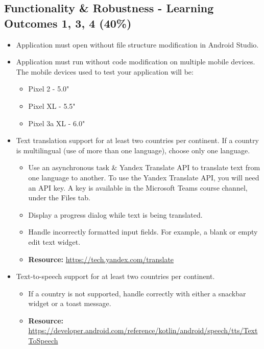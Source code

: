 \documentclass{article}
\begin{document}
\subsection*{Functionality \& Robustness - Learning Outcomes 1, 3, 4 (40\%)}
\begin{itemize}
	\item Application must open without file structure modification in Android Studio.
	\item Application must run without code modification on multiple mobile devices. The mobile devices used to test your application will be:
	      \begin{itemize}
	      	\item Pixel 2 - 5.0"
	      	\item Pixel XL - 5.5"
	      	\item Pixel 3a XL - 6.0"
	      \end{itemize}
	\item Text translation support for at least two countries per continent. If a country is multilingual (use of more than one language), choose only one language. 
	      \begin{itemize}
	      	\item Use an asynchronous task \& Yandex Translate API to translate text from one language to another. To use the Yandex Translate API, you will need an API key. A key is available in the Microsoft Teams course channel, under the Files tab.
	      	\item Display a progress dialog while text is being translated. 
	      	\item Handle incorrectly formatted input fields. For example, a blank or empty edit text widget.
	      	\item \textbf{Resource:} \footnotesize\href{https://tech.yandex.com/translate}{https://tech.yandex.com/translate}
	      \end{itemize}
	\item Text-to-speech support for at least two countries per continent. 
	      \begin{itemize}
	      	\item If a country is not supported, handle correctly with either a snackbar widget or a toast message.
	      	\item \textbf{Resource:} \footnotesize\href{https://developer.android.com/reference/kotlin/android/speech/tts/TextToSpeech}{https://developer.android.com/reference/kotlin/android/speech/tts/TextToSpeech} 
	      \end{itemize}

\end{itemize}
\end{document}
